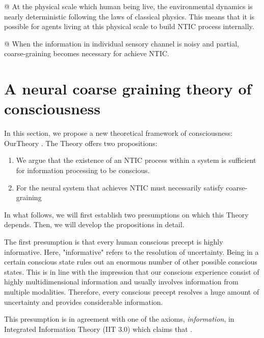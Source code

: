 \documentclass[utf8]{article}
\begin{document}
\begin{WritingMaterials}
				@ At the physical scale which human being live, the environmental dynamics is nearly deterministic following the laws of classical physics. This means that it is possible for agents living at this physical scale to build NTIC process internally.

				@ When the information in individual sensory channel is noisy and partial, coarse-graining becomes necessary for achieve NTIC.
			\end{WritingMaterials}




	\section{A neural coarse graining theory of consciousness}
	


        In this section, we propose a new theoretical framework of consciousness: \acf{OurTheory} . The Theory offers two propositions:
        \begin{enumerate}
            \item We argue that the existence of an NTIC process within a system is sufficient for information processing to be conscious.
            \item  For the neural system that achieves NTIC must necessarily satisfy coarse-graining
        \end{enumerate}

        In what follows, we will first establish two presumptions on which this Theory depends. Then, we will develop the propositions in detail. 
        
        The first presumption is that every human conscious precept is highly informative. Here, "informative" refers to the resolution of uncertainty. Being in a certain conscious state rules out an enormous number of other possible conscious states. This is in line with the impression that our conscious experience consist of highly multidimensional information and usually involves information from multiple modalities. Therefore, every conscious precept resolves a huge amount of uncertainty and provides considerable information.  
        
        This presumption is in agreement with one of the axioms, \textit{information}, in Integrated Information Theory (IIT 3.0) which claims that  \citep[p. 2]{oizumi2014phenomenology}.
        
\end{document}
